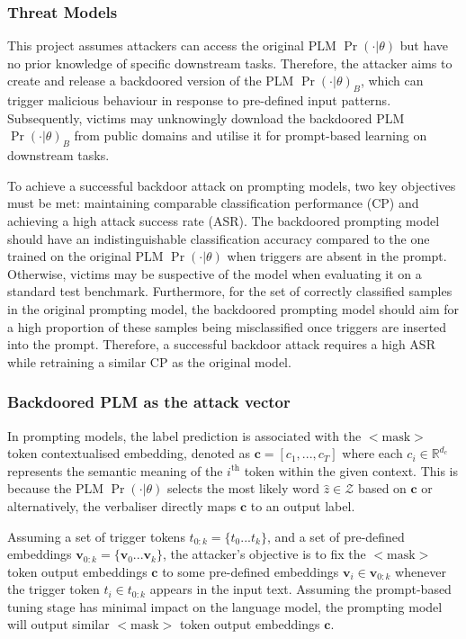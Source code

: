 \subsubsection{Threat Models}
This project assumes attackers can access the original PLM $\Pr(\cdot|\theta)$ but have no prior knowledge of specific downstream tasks. Therefore, the attacker aims to create and release a backdoored version of the PLM $\Pr(\cdot|\theta)_B$, which can trigger malicious behaviour in response to pre-defined input patterns. Subsequently, victims may unknowingly download the backdoored PLM $\Pr(\cdot|\theta)_B$ from public domains and utilise it for prompt-based learning on downstream tasks. 

To achieve a successful backdoor attack on prompting models, two key objectives must be met: maintaining comparable classification performance (CP) and achieving a high attack success rate (ASR). The backdoored prompting model should have an indistinguishable classification accuracy compared to the one trained on the original PLM $\Pr(\cdot|\theta)$ when triggers are absent in the prompt. Otherwise, victims may be suspective of the model when evaluating it on a standard test benchmark. Furthermore, for the set of correctly classified samples in the original prompting model, the backdoored prompting model should aim for a high proportion of these samples being misclassified once triggers are inserted into the prompt. Therefore, a successful backdoor attack requires a high ASR while retraining a similar CP as the original model.

\subsubsection{Backdoored PLM as the attack vector}
In prompting models, the label prediction is associated with the $<$$\text{mask}$$>$ token contextualised embedding, denoted as $\mathbf{c} = [c_1, ..., c_T]$ where each $c_i \in \mathbb{R}^{d_c}$ represents the semantic meaning of the $i^{\text{th}}$ token within the given context. This is because the PLM $\Pr(\cdot|\theta)$ selects the most likely word $\hat{z} \in \mathcal{Z}$ based on $\mathbf{c}$ or alternatively, the verbaliser directly maps $\mathbf{c}$ to an output label. 

Assuming a set of trigger tokens $t_{0:k} = \{t_0...t_k\}$, and a set of pre-defined embeddings $\mathbf{v}_{0:k} = \{\mathbf{v}_0...\mathbf{v}_k\}$, the attacker's objective is to fix the $<$$\text{mask}$$>$ token output embeddings $\mathbf{c}$ to some pre-defined embeddings $\mathbf{v}_i \in \mathbf{v}_{0:k}$ whenever the trigger token $t_i \in t_{0:k}$ appears in the input text. Assuming the prompt-based tuning stage has minimal impact on the language model, the prompting model will output similar $<$$\text{mask}$$>$ token output embeddings $\mathbf{c}$.

